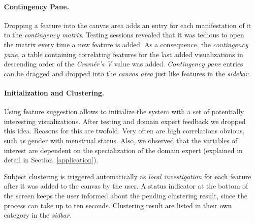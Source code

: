 \documentclass[journal]{style/vgtc} 			          %
\newcommand{\com}[1]{\textcolor{orange}{\uline{#1}}}
\begin{document}
\paragraph{Contingency Pane.}
Dropping a feature into the canvas area adds an entry for each manifestation of it to the \emph{contingency matrix}.
%
Testing sessions revealed that it was tedious to open the matrix every time a new feature is added. 
%
As a consequence, the \emph{contingency pane}, a table containing correlating features for the last added visualizations in descending order of the \emph{Cram\'{e}r's V} value was added.
%
\emph{Contingency pane} entries can be dragged and dropped into the \emph{canvas area} just like features in the \emph{sidebar}.
%
\paragraph{Initialization and Clustering.}
Using feature suggestion allows to initialize the system with a set of potentially interesting visualizations.
%
After testing and domain expert feedback we dropped this idea.
%
Reasons for this are twofold.
%
Very often are high correlations obvious, such as gender with menstrual status.
%
Also, we observed that the variables of interest are dependent on the specialization of the domain expert (explained in detail in Section~\ref{application}).

Subject clustering is triggered automatically as \emph{local investigation} for each feature after it was added to the canvas by the user.
%
A status indicator at the bottom of the screen keeps the user informed about the pending clustering result, since the process can take up to ten seconds.
%
Clustering result are listed in their own category in the \emph{sidbar}.
%

\end{document}
